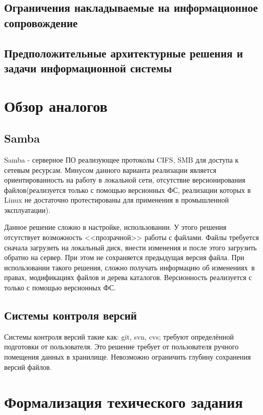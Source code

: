 \documentclass[utf8,usehyperref,12pt]{G7-32}
\begin{document}
\subsection{Ограничения накладываемые на информационное сопровождение}
\subsection{Предположительные архитектурные решения и задачи информационной системы}

\section{Обзор аналогов}
\subsection{Samba}

Samba - серверное ПО реализующее протоколы CIFS, SMB для доступа к сетевым ресурсам. 
Минусом данного варианта реализации является ориентированность на работу в локальной сети, 
отсутствие версионирования файлов(реализуется только с помощью версионных ФС, реализации 
которых в Linux не достаточно протестированы для применения в промышленной эксплуатации).


Данное решение сложно в настройке, использовании. У этого решения отсутствует возможность 
<<прозрачной>> работы с файлами. Файлы требуется сначала загрузить на локальный диск, внести 
изменения и после этого загрузить обратно на сервер. При этом не сохраняется предыдущая версия 
файла. При использовании такого решения, сложно получать информацию об изменениях~в правах, 
модификациях файлов и дерева каталогов. Версионность реализуется с только с помощью версионных ФС.

\subsection{Системы контроля версий}

Системы контроля версий такие как: git, svn, cvs; 
требуют определённой подготовки от пользователя. Это решение требует от пользователя ручного 
помещения данных в хранилище. Невозможно ограничить глубину сохранения версий файлов.

\section{Формализация техического задания}
\end{document}
